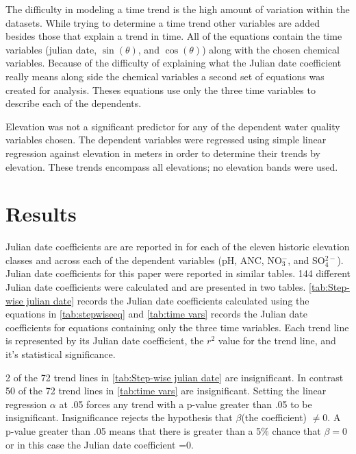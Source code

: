  The difficulty in modeling a time trend is the high amount of variation within the datasets. 
 While trying to determine a time trend other variables are added besides those that explain a trend in time. 
All of the equations contain the time variables (julian date, $\sin(\theta)$, and $\cos(\theta)$) along with the chosen chemical variables.  
Because of the difficulty of explaining what the Julian date coefficient really means along side the chemical variables a second set of equations was created for analysis.  
Theses equations use only the three time variables to describe each of the dependents.
 
 Elevation was not a significant predictor for any of the dependent water quality variables chosen.  
The dependent variables were regressed using simple linear regression against elevation in meters in order to determine their trends by elevation.  
These trends encompass all elevations; no elevation bands were used.
 
\section{Results}

Julian date coefficients are are reported in \citet{robinson2008ph} for each of the eleven historic elevation classes and across each of the dependent variables (pH, ANC, NO$_3^-$, and SO$_4^{2-}$).  
Julian date coefficients for this paper were reported in similar tables.  
144 different Julian date coefficients were calculated and are presented in two tables. 
 \autoref{tab:Step-wise julian date} records the Julian date coefficients calculated using the equations in \autoref{tab:stepwiseeq}  and \autoref{tab:time vars} records the Julian date coefficients for  equations containing only the three time variables.  
Each trend line is represented by its Julian date coefficient, the $r^2$ value for the trend line, and it's statistical significance.

2 of the 72 trend lines in \autoref{tab:Step-wise julian date} are insignificant. 
 In contrast 50 of the 72 trend lines in \autoref{tab:time vars} are insignificant.   
Setting the linear regression $\alpha$ at .05 forces any trend with a p-value greater than .05 to be insignificant. 
Insignificance rejects the hypothesis that $\beta$(the coefficient) $\neq 0$.  A p-value greater than .05 means that there is greater than a 5$\%$ chance that $\beta=0$ or in this case the Julian date coefficient =0. 

